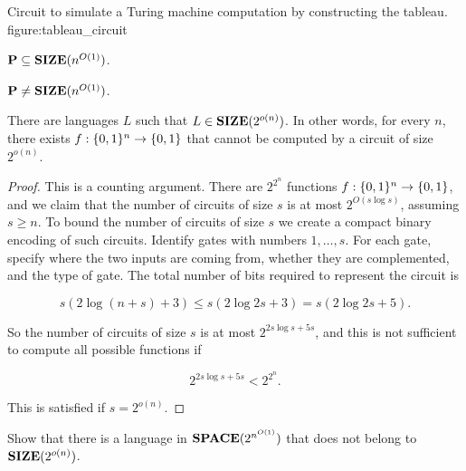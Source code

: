 {Circuit to simulate a Turing machine computation by constructing the tableau.}
{figure:tableau_circuit}


\begin{Cor}
$\p \subseteq \size(n^{O(1)})$.
\end{Cor}



\begin{Ex}
$\p \neq \size(n^{O(1)})$.
\end{Ex}


\begin{Prop}
There are languages $L$ such that $L \in \size(2^{o(n)})$. In other words, for every $n$, there exists $f:\{0,1\}^n \to \{0,1\}$ that cannot be computed by a circuit of size $2^{o(n)}$.
\end{Prop}

\begin{proof}
This is a counting argument. There are $2^{2^n}$ functions $f:\{0,1\}^n \to \{0,1\}$, and we claim that the number of circuits of size $s$ is at most $2^{O(s \log s)}$, assuming $s \geq n$. To bound the number of circuits of size $s$ we create a compact binary encoding of such circuits. Identify gates with numbers $1,\ldots,s$. For each gate, specify where the two inputs are coming from, whether they are complemented, and the type of gate. The total number of bits required to represent the circuit is

\begin{displaymath}
s(2 \log (n+s) + 3) \leq s(2 \log 2s + 3) = s(2 \log 2s + 5).
\end{displaymath}

So the number of circuits of size $s$ is at most $2^{2s \log s + 5s}$, and this is not sufficient to compute all possible functions if

\begin{displaymath}
2^{2s \log s + 5s} < 2^{2^n}.
\end{displaymath}

This is satisfied if $s = 2^{o(n)}$.
\end{proof}


\begin{Ex}
Show that there is a language in $\dspace(2^{n^{O(1)}})$ that does not belong to $\size(2^{o(n)})$.
\end{Ex}


